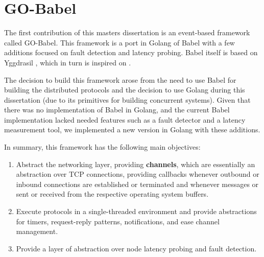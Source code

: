 

\chapter{GO-Babel}
\label{cha:GO-Babel}



The first contribution of this masters dissertation is an event-based framework called GO-Babel. This framework is a port in Golang  of Babel  with a few additions focused on fault detection and latency probing. Babel  itself is based on Yggdrasil , which in turn is inspired on .

The decision to build this framework arose from the need to use Babel for building the distributed protocols and the decision to use Golang during this dissertation (due to its primitives for building concurrent systems). Given that there was no implementation of Babel in Golang, and the current Babel implementation lacked needed features such as a fault detector and a latency measurement tool, we implemented a new version in Golang with these additions.

In summary, this framework has the following main objectives:

\begin{enumerate}

    \item Abstract the networking layer, providing \textbf{channels}, which are essentially an abstraction over TCP connections, providing callbacks whenever outbound or inbound connections are established or terminated and whenever messages or sent or received from the respective operating system buffers.

    \item Execute protocols in a single-threaded environment and provide abstractions for timers, request-reply patterns, notifications, and ease channel management.

    \item Provide a layer of abstraction over node latency probing and fault detection.

\end{enumerate}

